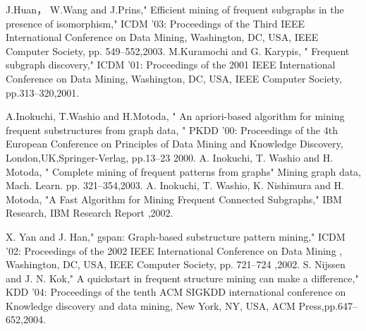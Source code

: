 \documentclass[12pt,fleqn]{jsotsuron}
\begin{document}
\begin{algorithm}
\newpage
{}
\begin{thebibliography}{99}%
J.Huan，  W.Wang  and  J.Prins," Efficient  mining  of 
frequent  subgraphs  in  the  presence  of  isomorphism," 
ICDM   ’03:   Proceedings   of   the   Third   IEEE 
International Conference on Data Mining, Washington,
DC, USA, IEEE Computer Society, pp. 549--552,2003.   
M.Kuramochi  and  G. Karypis, " Frequent  subgraph 
discovery," ICDM ’01: Proceedings of the 2001 IEEE 
International Conference on Data Mining, Washington,
DC,  USA,  IEEE  Computer  Society,  pp.313--320,2001.  

A.Inokuchi, T.Washio and H.Motoda, "  An 
apriori-based    algorithm    for    mining    frequent 
substructures    from    graph    data, "   PKDD    ’00: 
Proceedings  of  the  4th  European  Conference  on 
Principles of Data Mining and Knowledge Discovery, 
London,UK,Springer-Verlag, pp.13--23 2000.   
A. Inokuchi,  T. Washio  and  H. Motoda, " Complete 
mining  of  frequent  patterns  from  graphs"  Mining 
graph data, Mach. Learn. pp. 321--354,2003. 
A. Inokuchi, T. Washio, K. Nishimura and H. Motoda,
"A  Fast  Algorithm  for  Mining  Frequent  Connected 
Subgraphs,"  IBM  Research,  IBM  Research  Report ,2002.   


X. Yan  and  J. Han,"  gspan:  Graph-based  substructure 
pattern  mining,"  ICDM  ’02:  Proceedings  of  the  2002 
IEEE   International   Conference   on   Data   Mining 
,  Washington,  DC,  USA,  IEEE  Computer 
Society, pp. 721--724 ,2002.  
S. Nijssen  and  J. N.  Kok,"  A  quickstart  in  frequent 
structure  mining  can  make  a  difference,"  KDD  ’04: 
Proceedings of the tenth ACM SIGKDD international 
conference on Knowledge discovery and data mining, 
New  York,  NY,  USA,  ACM  Press,pp.647--652,2004.  



\end{thebibliography}
\end{algorithm}
\end{document}
